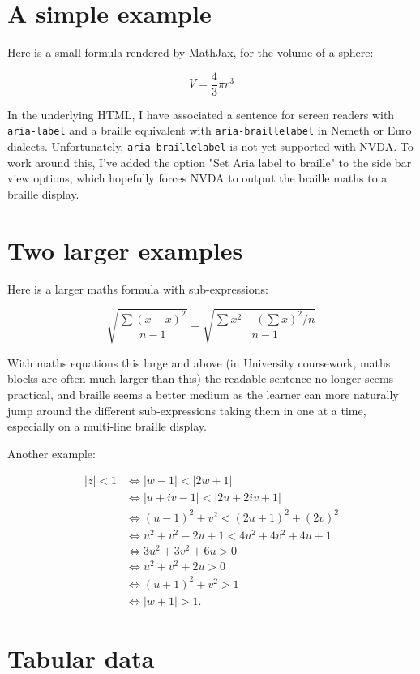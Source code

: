 \documentclass{article}
\begin{document}
\section{A simple example}

Here is a small formula rendered by MathJax, for the volume of a sphere:

$$
V=\frac{4}{3} \pi r^3
$$

In the underlying HTML, I have associated a sentence for screen readers with \verb|aria-label| and a braille equivalent with \verb|aria-braillelabel| in Nemeth or Euro dialects.  Unfortunately, \verb|aria-braillelabel| is \href{https://github.com/nvaccess/nvda/issues/11829}{not yet supported} with NVDA.  To work around this, I've added the option "Set Aria label to braille" to the side bar view options, which hopefully forces NVDA to output the braille maths to a braille display.

\section{Two larger examples}

Here is a larger maths formula with sub-expressions:

$$
\sqrt{\frac{\sum(x-\bar{x})^2}{n-1}}=\sqrt{\frac{\sum x^2-\left(\sum x\right)^2 / n}{n-1}}
$$

With maths equations this large and above (in University coursework, maths blocks are often much larger than this) the readable sentence no longer seems practical, and braille seems a better medium as the learner can more naturally jump around the different sub-expressions taking them in one at a time, especially on a multi-line braille display.

Another example:

\begin{align*}
|z| < 1 &\iff |w - 1| < |2w + 1| \\
&\iff |u + iv - 1| < |2u + 2iv + 1| \\
&\iff (u - 1)^2 + v^2 < (2u + 1)^2 + (2v)^2 \\
&\iff u^2 + v^2 - 2u + 1 < 4u^2 + 4v^2 + 4u + 1 \\
&\iff 3u^2 + 3v^2 + 6u > 0 \\
&\iff u^2 + v^2 + 2u > 0 \\
&\iff (u + 1)^2 + v^2 > 1 \\
&\iff |w + 1| > 1.
\end{align*}

\section{Tabular data}
\end{document}
